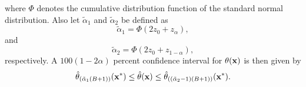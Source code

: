 \documentclass[a4paper 12pt]{article}
\numberwithin{equation}{section}
\begin{document}
\noindent where $  \Phi $  denotes the cumulative distribution function of the standard normal distribution. Also let $\tilde{\alpha}_{1} $ and $\tilde{\alpha}_{2} $ be defined as
\begin{equation}
\tilde{\alpha}_{1} = \Phi(2z_{0} + z_{\alpha}), 
\end{equation}
\noindent and 
\begin{equation}
\tilde{\alpha}_{2} = \Phi(2z_{0} + z_{1-\alpha}), 
\end{equation}
\noindent respectively.  A $100(1-2 \alpha)$ percent confidence interval for $ \theta ({\bf x})$ is then given by
\begin{equation}
\hat{\theta}_{\left(\tilde{\alpha}_{1}(B +1) \right)} ({\bf {x}^{*}})  \leq \hat{\theta} ({\bf x}) \leq \hat{\theta}_{\left((\tilde{\alpha}_{2} -1)(B +1) \right)} ({\bf {x}^{*}}). 
\end{equation}
\end{document}

